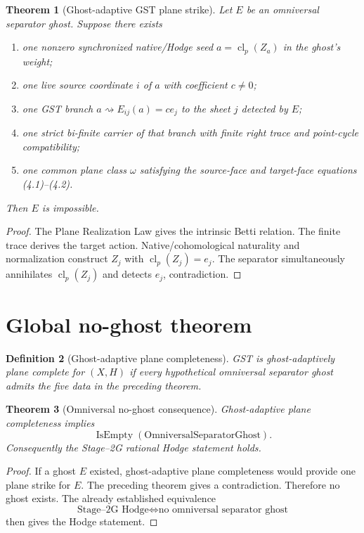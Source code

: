 \documentclass[11pt]{article}
\newtheorem{definition}{Definition}[section]
\newtheorem{theorem}[definition]{Theorem}
\newcommand{\cl}{\operatorname{cl}}
\begin{document}
\begin{theorem}[Ghost-adaptive GST plane strike]
Let $E$ be an omniversal separator ghost.  Suppose there exists
\begin{enumerate}[label=(\roman*)]
  \item one nonzero synchronized native/Hodge seed $a=\cl_p(Z_a)$ in the
        ghost's weight;
  \item one live source coordinate $i$ of $a$ with coefficient $c\ne0$;
  \item one GST branch $a\rightsquigarrow E_{ij}(a)=c e_j$ to the sheet $j$
        detected by $E$;
  \item one strict bi-finite carrier of that branch with finite right trace and
        point-cycle compatibility;
  \item one common plane class $\omega$ satisfying the source-face and
        target-face equations (4.1)--(4.2).
\end{enumerate}
Then $E$ is impossible.
\end{theorem}

\begin{proof}
The Plane Realization Law gives the intrinsic Betti relation.  The finite trace
derives the target action.  Native/cohomological naturality and normalization
construct $Z_j$ with $\cl_p(Z_j)=e_j$.  The separator simultaneously annihilates
$\cl_p(Z_j)$ and detects $e_j$, contradiction.
\end{proof}

\section{Global no-ghost theorem}

\begin{definition}[Ghost-adaptive plane completeness]
GST is \emph{ghost-adaptively plane complete} for $(X,H)$ if every hypothetical
omniversal separator ghost admits the five data in the preceding theorem.
\end{definition}

\begin{theorem}[Omniversal no-ghost consequence]
Ghost-adaptive plane completeness implies
\[
  \operatorname{IsEmpty}(\text{OmniversalSeparatorGhost}).
\]
Consequently the Stage--2G rational Hodge statement holds.
\end{theorem}

\begin{proof}
If a ghost $E$ existed, ghost-adaptive plane completeness would provide one
plane strike for $E$.  The preceding theorem gives a contradiction.  Therefore
no ghost exists.  The already established equivalence
\[
  \text{Stage--2G Hodge}
  \iff
  \text{no omniversal separator ghost}
\]
then gives the Hodge statement.
\end{proof}
\end{document}
